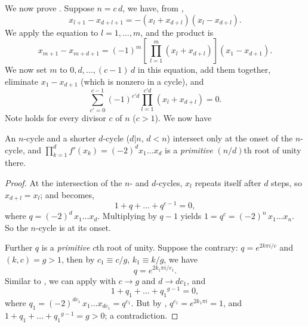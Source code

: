 \documentclass[preprint]{revtex4-1}
\begin{document}


We now prove .
Suppose $n = c \,d$, we have, from ,
\[
  x_{l+1} - x_{d+l+1} = - (x_l + x_{d+l}) (x_l - x_{d+l}).
\]
We apply the equation to $l = 1, \ldots, m$, and the product is
\[
  x_{m+1} - x_{m + d+1} =
  (-1)^{m} \left[ \, \prod_{l=1}^{m} (x_l + x_{d+l}) \right]
    (x_1 - x_{d+1}).
\]
We now set $m$ to $0, d, \ldots, (c-1)\,d$ in this equation,
  add them together, eliminate $x_1 - x_{d+1}$
  (which is nonzero in a cycle), and
\begin{equation}
  \sum_{c' = 0}^{c-1}
    (-1)^{c' d} \prod_{l=1}^{c' d} (x_l + x_{d+l})
   = 0.
\label{eq:stair}
\end{equation}
%
Note  holds for every divisor $c$ of $n$ ($c > 1$). We now have



\begin{theorem}
An $n$-cycle and a shorter $d$-cycle ($d|n$, $d< n$)
  intersect only at the onset of the $n$-cycle,
%
and $\prod_{k=1}^{d} f'(x_k) = (-2)^d x_1 \dots x_d$ is
a \emph{primitive} $(n/d)$th root of unity there.
\label{thm:cbifur}
\end{theorem}


\begin{proof}
%
At the intersection of the $n$- and $d$-cycles,
  $x_l$ repeats itself after $d$ steps, so
  $x_{d + l} = x_l$;
and  becomes,
%
\begin{equation}
  1 + q + \dots + q^{c-1} = 0,
\label{eq:cbifur}
\end{equation}
%
where $q = (-2)^d \, x_1 \dots x_d$.
%
Multiplying  by $q - 1$ yields
  $1 = q^c = (-2)^n \, x_1 \dots x_n$.
So the $n$-cycle is at its onset.


Further $q$ is a \emph{primitive} $c$th root of unity.
%
Suppose the contrary: $q = e^{2k\pi i/c}$ and $(k, c) = g >1$,
  then by $c_1 \equiv c/g$, $k_1 \equiv k/g$, we have
\begin{equation}
  q = e^{2k_1\pi i/ c_1}.
\label{eq:qd}
\end{equation}
Similar to , we can apply  with $c \rightarrow g$ and $d \rightarrow d c_1$, and
\[
  1 + q_1 + \dots + {q_1}^{g-1} = 0,
\]
  where $q_1 = (-2)^{d c_1} \, x_1 \dots x_{dc_1} = q^{c_1}$.
But by , $q^{c_1} = e^{2 k_1\pi i} = 1$,
and $1 + q_1 + \dots + {q_1}^{g-1} = g > 0$; a contradiction.
%
\end{proof}
\end{document}
